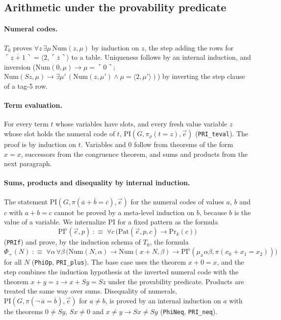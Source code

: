 \documentclass[11pt]{article}
\theoremstyle{plain}
\theoremstyle{definition}
\theoremstyle{remark}
\newcommand{\T}[1]{T_{#1}}
\newcommand{\Prv}{\mathrm{Pr}}
\newcommand{\gn}[1]{\ulcorner #1 \urcorner}
\newcommand{\num}[1]{\overline{#1}}
\newcommand{\Num}{\mathrm{Num}}
\newcommand{\Pat}{\mathrm{Pat}}
\newcommand{\PRI}{\mathrm{PI}}
\newcommand{\pair}[2]{\langle #1, #2\rangle}
\newcommand{\rocq}[1]{\texttt{#1}}
\begin{document}
\subsection{Arithmetic under the provability predicate}\label{sec:arith}

\paragraph{Numeral codes.}
$\T0$ proves $\forall z\, \exists \mu\, \Num(z,\mu)$ by induction on $z$,
the step adding the rows for $\gn{\num{z+1}} = \pair{2}{\gn{\num z}}$ to
a table.  Uniqueness follows by an internal induction, and inversion
($\Num(0,\mu) \to \mu = \gn{0}$;
$\Num(Sz,\mu) \to \exists \mu'\,(\Num(z,\mu') \wedge \mu = \pair{2}{\mu'})$)
by inverting the step clause of a tag-5 row.

\paragraph{Term evaluation.}
For every term $t$ whose variables have slots, and every fresh value
variable $z$ whose slot holds the numeral code of $t$,
$\PRI(G, \pi_\rho(t = z), \vec e)$ (\rocq{PRI\_teval}).  The proof is by
induction on $t$.  Variables and $0$ follow from theorems of the form
$x = x$, successors from the congruence theorem, and sums and products
from the next paragraph.

\paragraph{Sums, products and disequality by internal induction.}
The statement $\PRI(G, \pi(\num a + \num b = \num c), \vec e)$ for the
numeral codes of values $a$, $b$ and $c$ with $a + b = c$ cannot be
proved by a meta-level induction on $b$, because $b$ is the value of a
variable.  We internalize $\PRI$ for a fixed pattern as the formula
\[
  \mathrm{PI}^{\flat}(\vec e, p) \;:\equiv\; \forall c\,
  \bigl(\Pat(\vec e, p, c) \to \Prv_k(c)\bigr)
\]
(\rocq{PRIf}) and prove, by the induction schema of $\T0$, the formula
\[
  \Phi_+(N) \;:\equiv\; \forall \alpha\, \forall \beta\,
  \bigl(\Num(N, \alpha) \to \Num(x + N, \beta) \to
  \mathrm{PI}^{\flat}(\mu_x\alpha\beta, \pi(x_0 + x_1 = x_2))\bigr)
\]
for all $N$ (\rocq{PhiOp}, \rocq{PRI\_plus}).  The base case uses the
theorem $x + 0 = x$, and the step combines the induction hypothesis at
the inverted numeral code with the theorem
$x + y = z \to x + Sy = Sz$ under the provability predicate.  Products
are treated the same way over sums.  Disequality of numerals,
$\PRI(G, \pi(\neg\, \num a = \num b), \vec e)$ for $a \neq b$, is proved
by an internal induction on $a$ with the theorems $0 \neq Sy$,
$Sx \neq 0$ and $x \neq y \to Sx \neq Sy$ (\rocq{PhiNeq},
\rocq{PRI\_neq}).
\end{document}
